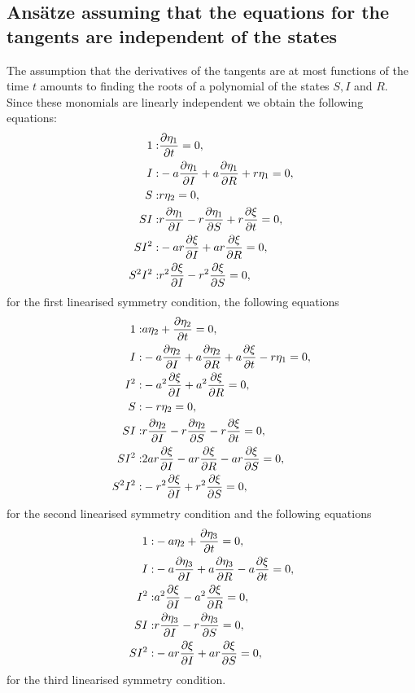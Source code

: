 \subsection{Ans\"atze assuming that the equations for the tangents are independent of the states}
The assumption that the derivatives of the tangents are at most functions of the time $t$ amounts to finding the roots of a polynomial of the states $S,I$ and $R$. Since these monomials are linearly independent we obtain the following equations:
\begin{align}
1:&\pdv{\eta_1}{t}=0,\\
I:&- a \pdv{\eta_1}{I} + a \pdv{\eta_1}{R} + r\eta_1=0,\\
S:&r\eta_2=0,\\
S I:&r \pdv{\eta_1}{I} - r \pdv{\eta_1}{S} + r \pdv{\xi}{t}=0,\\
S I^{2}:&- a r \pdv{\xi}{I} + a r \pdv{\xi}{R}=0,\\
S^{2} I^{2}:&r^{2} \pdv{\xi}{I} - r^{2} \pdv{\xi}{S}=0,
\end{align}
for the first linearised symmetry condition, the following equations
\begin{align}
1:&a\eta_2 + \pdv{\eta_2}{t}=0,\\
I:&- a \pdv{\eta_2}{I} + a \pdv{\eta_2}{R} + a \pdv{\xi}{t} - r\eta_1=0,\\
I^{2}:&- a^{2} \pdv{\xi}{I} + a^{2} \pdv{\xi}{R}=0,\\
S:&- r\eta_2=0,\\
S I:&r \pdv{\eta_2}{I} - r \pdv{\eta_2}{S} - r \pdv{\xi}{t}=0,\\
S I^{2}:&2 a r \pdv{\xi}{I} - a r \pdv{\xi}{R} - a r \pdv{\xi}{S}=0,\\
S^{2} I^{2}:&- r^{2} \pdv{\xi}{I} + r^{2} \pdv{\xi}{S}=0,
\end{align}
for the second linearised symmetry condition and the following equations
\begin{align}
1:&- a\eta_2 + \pdv{\eta_3}{t}=0,\\
I:&- a \pdv{\eta_3}{I} + a \pdv{\eta_3}{R} - a \pdv{\xi}{t}=0,\\
I^{2}:&a^{2} \pdv{\xi}{I} - a^{2} \pdv{\xi}{R}=0,\\
S I:&r \pdv{\eta_3}{I} - r \pdv{\eta_3}{S}=0,\\
S I^{2}:&- a r \pdv{\xi}{I} + a r \pdv{\xi}{S}=0,
\end{align}
for the third linearised symmetry condition.